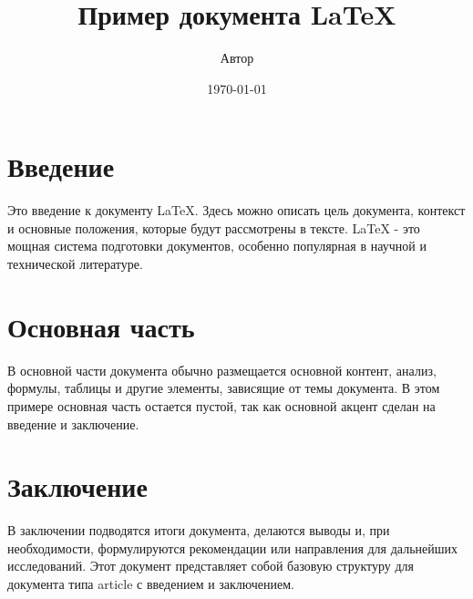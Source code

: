 \documentclass[12pt]{article}
\title{Пример документа LaTeX}
\author{Автор}
\date{\today}
\begin{document}
\maketitle

\section{Введение}
Это введение к документу LaTeX. Здесь можно описать цель документа, контекст и основные положения, которые будут рассмотрены в тексте. LaTeX - это мощная система подготовки документов, особенно популярная в научной и технической литературе.

\section{Основная часть}
В основной части документа обычно размещается основной контент, анализ, формулы, таблицы и другие элементы, зависящие от темы документа. В этом примере основная часть остается пустой, так как основной акцент сделан на введение и заключение.

\section{Заключение}
В заключении подводятся итоги документа, делаются выводы и, при необходимости, формулируются рекомендации или направления для дальнейших исследований. Этот документ представляет собой базовую структуру для документа типа article с введением и заключением.
\end{document}
